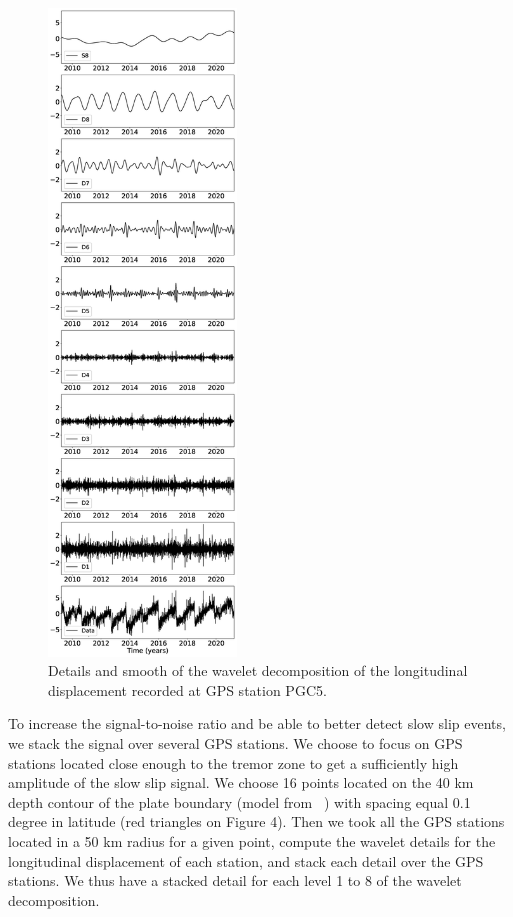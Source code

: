 \documentclass[draft]{agujournal2018}
\begin{document}
\begin{figure}
\noindent\includegraphics[width=5cm, trim={0cm 0cm 0cm 0cm},clip]{figures/cleaned_PGC5_lon.eps}
\caption{Details and smooth of the wavelet decomposition of the longitudinal displacement recorded at GPS station PGC5.}
\label{pngfiguresample}
\end{figure}

To increase the signal-to-noise ratio and be able to better detect slow slip events, we stack the signal over several GPS stations. We choose to focus on GPS stations located close enough to the tremor zone to get a sufficiently high amplitude of the slow slip signal. We choose 16 points located on the 40 km depth contour of the plate boundary (model from ~\citet{PRE_2003}) with spacing equal 0.1 degree in latitude (red triangles on Figure 4). Then we took all the GPS stations located in a 50 km radius for a given point, compute the wavelet details for the longitudinal displacement of each station, and stack each detail over the GPS stations. We thus have a stacked detail for each level 1 to 8 of the wavelet decomposition. \\
\end{document}
